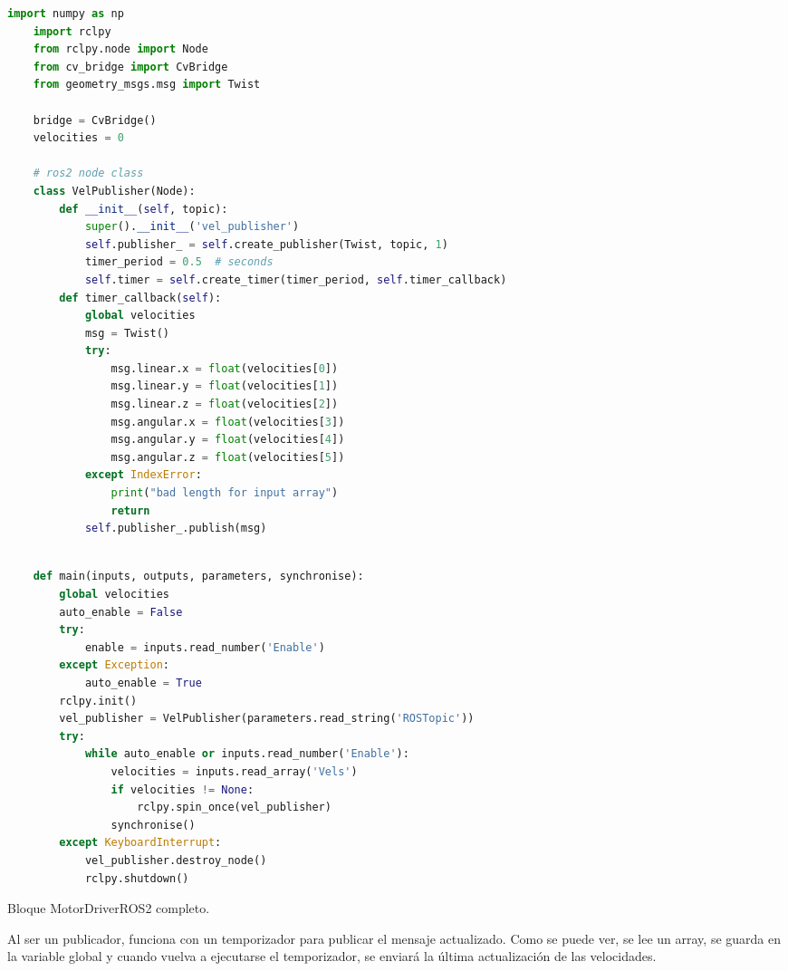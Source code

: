 \begin{code}[H]
  \begin{lstlisting}[language=python]
    import numpy as np
    import rclpy
    from rclpy.node import Node
    from cv_bridge import CvBridge
    from geometry_msgs.msg import Twist

    bridge = CvBridge()
    velocities = 0

    # ros2 node class
    class VelPublisher(Node):
        def __init__(self, topic):
            super().__init__('vel_publisher')
            self.publisher_ = self.create_publisher(Twist, topic, 1)
            timer_period = 0.5  # seconds
            self.timer = self.create_timer(timer_period, self.timer_callback)
        def timer_callback(self):
            global velocities
            msg = Twist()
            try:
                msg.linear.x = float(velocities[0])
                msg.linear.y = float(velocities[1])
                msg.linear.z = float(velocities[2])
                msg.angular.x = float(velocities[3])
                msg.angular.y = float(velocities[4])
                msg.angular.z = float(velocities[5])
            except IndexError:
                print("bad length for input array")
                return
            self.publisher_.publish(msg)
  \end{lstlisting}
\end{code}
\begin{code}[H]
  \begin{lstlisting}[language=python]

    def main(inputs, outputs, parameters, synchronise):
        global velocities
        auto_enable = False
        try:
            enable = inputs.read_number('Enable')
        except Exception:
            auto_enable = True
        rclpy.init()
        vel_publisher = VelPublisher(parameters.read_string('ROSTopic'))
        try:
            while auto_enable or inputs.read_number('Enable'):
                velocities = inputs.read_array('Vels')
                if velocities != None:
                    rclpy.spin_once(vel_publisher)
                synchronise()
        except KeyboardInterrupt:
            vel_publisher.destroy_node()
            rclpy.shutdown()
  \end{lstlisting}
  \caption[Bloque MotorDriverROS2]{Bloque MotorDriverROS2 completo.}
  \label{cod:motordriverros2_all}
\end{code}

Al ser un publicador, funciona con un temporizador para publicar el mensaje actualizado. Como se puede ver, se lee un array, se guarda en
la variable global y cuando vuelva a ejecutarse el temporizador, se enviará la última actualización de las velocidades.

